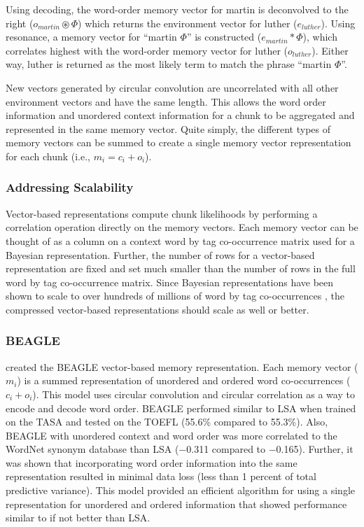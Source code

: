 \documentclass[man,floatsintext,donotrepeattitle]{apa6}
\begin{document}
Using decoding, the word-order memory vector for martin is deconvolved to the right ($o_{martin} \circledast \Phi$) which returns the environment vector for luther ($e_{luther}$).
Using resonance, a memory vector for ``martin $\Phi$'' is constructed ($e_{martin} * \Phi$), which correlates highest with the word-order memory vector for luther ($o_{luther}$).
Either way, luther is returned as the most likely term to match the phrase ``martin $\Phi$''.

New vectors generated by circular convolution are uncorrelated with all other environment vectors and have the same length.
This allows the word order information and unordered context information for a chunk to be aggregated and represented in the same memory vector.
Quite simply, the different types of memory vectors can be summed to create a single memory vector representation for each chunk (i.e., $m_{i} = c_{i} + o_{i}$).

\subsubsection{Addressing Scalability}

Vector-based representations compute chunk likelihoods by performing a correlation operation directly on the memory vectors.
Each memory vector can be thought of as a column on a context word by tag co-occurrence matrix used for a Bayesian representation.
Further, the number of rows for a vector-based representation are fixed and set much smaller than the number of rows in the full word by tag co-occurrence matrix.
Since Bayesian representations have been shown to scale to over hundreds of millions of word by tag co-occurrences \parencite{Stanley2013}, the compressed vector-based representations should scale as well or better.

\subsubsection{BEAGLE}

\textcite{Jones2007} created the BEAGLE vector-based memory representation.
Each memory vector ($m_{i}$) is a summed representation of unordered and ordered word co-occurrences ($c_{i} + o_{i}$).
This model uses circular convolution and circular correlation as a way to encode and decode word order.
BEAGLE performed similar to LSA when trained on the TASA and tested on the TOEFL (\num{55.6}\% compared to \num{55.3}\%).
Also, BEAGLE with unordered context and word order was more correlated to the WordNet synonym database than LSA (\num{-.311} compared to \num{-.165}).
Further, it was shown that incorporating word order information into the same representation resulted in minimal data loss (less than 1 percent of total predictive variance).
This model provided an efficient algorithm for using a single representation for unordered and ordered information that showed performance similar to if not better than LSA.
\end{document}
